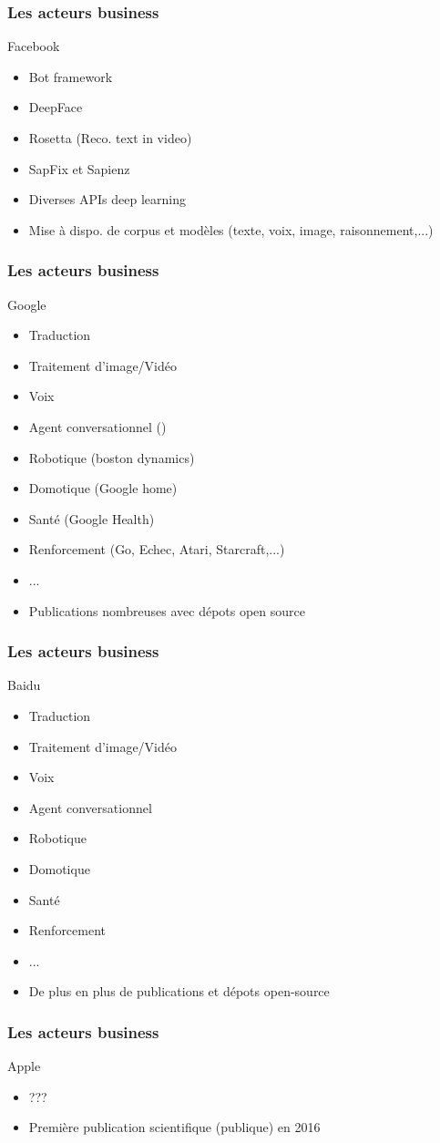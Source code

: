 \begin{frame}
  \frametitle{Les acteurs business}
  Facebook
  \begin{itemize}
  \item Bot framework
  \item DeepFace
  \item Rosetta (Reco. text in video)
  \item SapFix et Sapienz 
  \item Diverses APIs deep learning
  \item Mise à dispo. de corpus et modèles (texte, voix, image, raisonnement,...)
  \end{itemize}
\end{frame}

\begin{frame}
  \frametitle{Les acteurs business}
  Google
  \begin{itemize}
  \item Traduction
  \item Traitement d'image/Vidéo
  \item Voix
  \item Agent conversationnel (\href{https://www.youtube.com/watch?v=d40jgFZ5hXk}{})
  \item Robotique (boston dynamics)
  \item Domotique (Google home)
  \item Santé (Google Health)
  \item Renforcement (Go, Echec, Atari, Starcraft,...)
  \item ...
  \item Publications nombreuses avec dépots open source
  \end{itemize}
\end{frame}

\begin{frame}
  \frametitle{Les acteurs business}
  Baidu
  \begin{itemize}
  \item Traduction
  \item Traitement d'image/Vidéo
  \item Voix
  \item Agent conversationnel
  \item Robotique
  \item Domotique
  \item Santé
  \item Renforcement
  \item ...
  \item De plus en plus de publications et dépots open-source
  \end{itemize}
\end{frame}

\begin{frame}
  \frametitle{Les acteurs business}
  Apple
  \begin{itemize}
  \item ???
  \item Première publication scientifique (publique) en 2016
  \end{itemize}
\end{frame}
